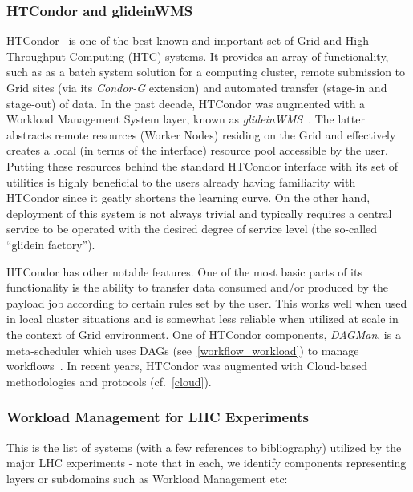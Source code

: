 \subsubsection{HTCondor and glideinWMS}
\label{htcondor}
HTCondor~\cite{htcondor} is one of the best known and  important set of Grid and High-Throughput Computing (HTC) systems. It provides an array of functionality, such as
as a batch system solution for a computing cluster, remote submission to Grid sites (via its \textit{Condor-G} extension) and automated transfer (stage-in and stage-out) of data.
In the past decade, HTCondor was augmented with a  Workload Management System layer, known as \textit{glideinWMS}~\cite{glideinwms}. The latter abstracts remote
resources (Worker Nodes) residing on the Grid and effectively creates a local (in terms of the interface) resource pool accessible by the user.
Putting these resources behind the standard HTCondor interface with its set of utilities is highly beneficial to the users already having familiarity with HTCondor since it geatly shortens the learning curve.
On the other hand, deployment of this system is not always trivial and typically requires a central service to be operated with the desired degree of service level (the so-called ``glidein factory'').

HTCondor has other notable features. One of the most basic parts of its functionality is the ability to transfer data consumed and/or produced by the payload job according to
certain rules set by the user. This works well when used in local cluster situations and is somewhat less reliable when utilized at scale in the context of Grid environment.
One of HTCondor components, \textit{DAGMan}, is a meta-scheduler which uses DAGs (see~\ref{workflow_workload}) to manage workflows~\cite{dagman}. In recent years,
HTCondor was augmented  with Cloud-based methodologies and protocols (cf.~\ref{cloud}).

\subsubsection{Workload Management for LHC Experiments}
This is the list of systems (with a few references to bibliography) utilized by the major LHC experiments - note that in each, we identify components representing layers or subdomains such as Workload Management etc:

